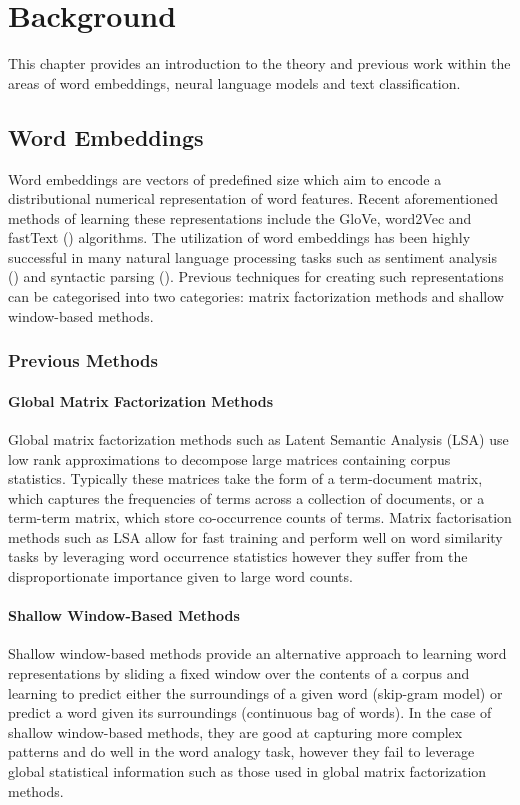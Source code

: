 \chapter{Background}
\label{chap:background}
This chapter provides an introduction to the theory and previous work within the areas of word embeddings, neural language models and text classification. 

\section{Word Embeddings}
Word embeddings are vectors of predefined size which aim to encode a distributional numerical representation of word features. Recent aforementioned methods of learning these representations include the GloVe, word2Vec and fastText (\cite{Bojanowski2017}) algorithms. The utilization of word embeddings has been highly successful in many natural language processing tasks such as sentiment analysis (\cite{Socher2013}) and syntactic parsing (\cite{Socher2013}). Previous techniques for creating such representations can be categorised into two categories: matrix factorization methods and shallow window-based methods.
\subsection{Previous Methods}
\subsubsection{Global Matrix Factorization Methods}
Global matrix factorization methods such as Latent Semantic Analysis (LSA) use low rank approximations to decompose large matrices containing corpus statistics. Typically these matrices take the form of a term-document matrix, which captures the frequencies of terms across a collection of documents, or a term-term matrix, which store co-occurrence counts of terms. Matrix factorisation methods such as LSA allow for fast training and perform well on word similarity tasks by leveraging word occurrence statistics however they suffer from the disproportionate importance given to large word counts.
\subsubsection{Shallow Window-Based Methods}
Shallow window-based methods provide an alternative approach to learning word representations by sliding a fixed window over the contents of a corpus and learning to predict either the surroundings of a given word (skip-gram model) or predict a word given its surroundings (continuous bag of words). In the case of shallow window-based methods, they are good at capturing more complex patterns and do well in the word analogy task, however they fail to leverage global statistical information such as those used in global matrix factorization methods.
